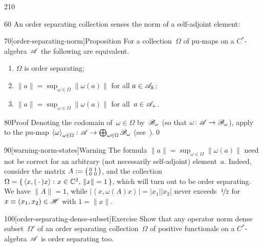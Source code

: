 \begin{parsec}{210}
\begin{point}{60}
An order separating
collection senses the norm 
of a self-adjoint element:
\end{point}
\begin{point}{70}[order-separating-norm]{Proposition}%
For a collection~$\Omega$ of pu-maps on a $C^*$-algebra~$\mathscr{A}$
the following are equivalent.
\begin{enumerate}
\item 
	$\Omega$ is order separating;
\item
	$\|a\|= \sup_{\omega\in\Omega} \left\|\omega(a)\right\|$
	for all $a\in \mathscr{A}_{\mathbb{R}}$;
\item
	$\|a\| = \sup_{\omega\in\Omega} \left\|\omega(a)\right\|$
	for all~$a\in \mathscr{A}_{+}$.
\end{enumerate}%
\spacingfix{}%
\begin{point}{80}{Proof}%
Denoting the codomain of~$\omega\in\Omega$
by~$\mathscr{B}_\omega$
(so that $\omega\colon \mathscr{A}\to\mathscr{B}_\omega$),
apply~
to the pu-map $\left<\omega\right>_{\omega\in\Omega}\colon 
\mathscr{A}\to\bigoplus_{\omega\in\Omega}
\mathscr{B}_\omega$ (see~).\qed
\end{point}
\begin{point}{90}[warning-norm-states]{Warning}%
The formula
$\|a\|=\sup_{\omega\in\Omega} \|\omega(a)\|$
need not be correct
for an arbitrary (not necessarily self-adjoint)
element~$a$.
Indeed,
consider the matrix $A:=\smash{%
\bigl(\begin{smallmatrix}0&1\\0&0\end{smallmatrix}\bigr)}$,
and the collection $\Omega=\{\,\left<x,(\,\cdot\,)x\right>\colon 
x\in \mathbb{C}^2,\,\|x\|=1\,\}$,
which will turn out to be order separating.
We have $\|A\|=1$,
while $\left| \left<x,\omega(A)x\right>\right|
 =\left|x_1\right|\left|x_2\right|$
 never exceeds~$\nicefrac{1}{2}$
for $x\equiv (x_1,x_2)\in \mathscr{H}$ with $1=\|x\|$.
\end{point}
\end{point}
\begin{point}{100}[order-separating-dense-subset]{Exercise}%
Show that any operator norm dense subset~$\Omega'$
of an order separating collection~$\Omega$
of positive functionals
on a $C^*$-algebra~$\mathscr{A}$
is order separating too.
\end{point}
\end{parsec}

